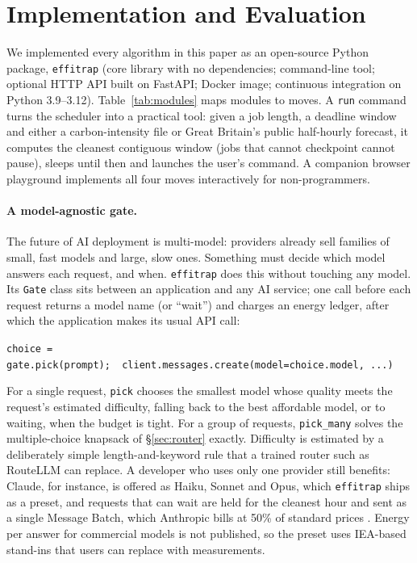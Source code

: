 \documentclass[11pt]{article}
\theoremstyle{definition}
\theoremstyle{remark}
\begin{document}
\section{Implementation and Evaluation}\label{sec:impl}

We implemented every algorithm in this paper as an open-source Python package, \texttt{effitrap} (core library with no dependencies; command-line tool; optional HTTP API built on FastAPI; Docker image; continuous integration on Python 3.9--3.12). Table~\ref{tab:modules} maps modules to moves. A \texttt{run} command turns the scheduler into a practical tool: given a job length, a deadline window and either a carbon-intensity file or Great Britain's public half-hourly forecast, it computes the cleanest contiguous window (jobs that cannot checkpoint cannot pause), sleeps until then and launches the user's command. A companion browser playground implements all four moves interactively for non-programmers.

\paragraph{A model-agnostic gate.} The future of AI deployment is multi-model: providers already sell families of small, fast models and large, slow ones. Something must decide which model answers each request, and when. \texttt{effitrap} does this without touching any model. Its \texttt{Gate} class sits between an application and any AI service; one call before each request returns a model name (or ``wait'') and charges an energy ledger, after which the application makes its usual API call:
\begin{center}\small
\texttt{choice = gate.pick(prompt);\ \ client.messages.create(model=choice.model, ...)}
\end{center}
For a single request, \texttt{pick} chooses the smallest model whose quality meets the request's estimated difficulty, falling back to the best affordable model, or to waiting, when the budget is tight. For a group of requests, \texttt{pick\_many} solves the multiple-choice knapsack of \S\ref{sec:router} exactly. Difficulty is estimated by a deliberately simple length-and-keyword rule that a trained router such as RouteLLM can replace. A developer who uses only one provider still benefits: Claude, for instance, is offered as Haiku, Sonnet and Opus, which \texttt{effitrap} ships as a preset, and requests that can wait are held for the cleanest hour and sent as a single Message Batch, which Anthropic bills at 50\% of standard prices \citep{anthropicbatch}. Energy per answer for commercial models is not published, so the preset uses IEA-based stand-ins that users can replace with measurements.
\end{document}
